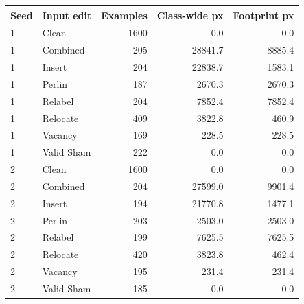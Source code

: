\begin{tabular}{llrrr}
\toprule
Seed & Input edit & Examples & Class-wide px & Footprint px \\
\midrule
1 & Clean & 1600 & 0.0 & 0.0 \\
1 & Combined & 205 & 28841.7 & 8885.4 \\
1 & Insert & 204 & 22838.7 & 1583.1 \\
1 & Perlin & 187 & 2670.3 & 2670.3 \\
1 & Relabel & 204 & 7852.4 & 7852.4 \\
1 & Relocate & 409 & 3822.8 & 460.9 \\
1 & Vacancy & 169 & 228.5 & 228.5 \\
1 & Valid Sham & 222 & 0.0 & 0.0 \\
\midrule
2 & Clean & 1600 & 0.0 & 0.0 \\
2 & Combined & 204 & 27599.0 & 9901.4 \\
2 & Insert & 194 & 21770.8 & 1477.1 \\
2 & Perlin & 203 & 2503.0 & 2503.0 \\
2 & Relabel & 199 & 7625.5 & 7625.5 \\
2 & Relocate & 420 & 3823.8 & 462.4 \\
2 & Vacancy & 195 & 231.4 & 231.4 \\
2 & Valid Sham & 185 & 0.0 & 0.0 \\
\bottomrule
\end{tabular}
